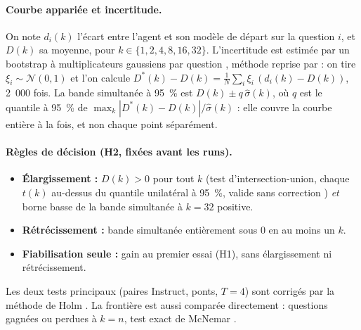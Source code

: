 \documentclass[11pt,a4paper]{article}
\begin{document}
\paragraph{Courbe appariée et incertitude.} On note $d_i(k)$ l'écart entre l'agent et son modèle de départ sur la question $i$, et $D(k)$ sa moyenne, pour $k \in \{1, 2, 4, 8, 16, 32\}$. L'incertitude est estimée par un bootstrap à multiplicateurs gaussiens par question \citep{chernozhukov2013gaussian}, méthode reprise par \citet{yang2026crossovers} : on tire $\xi_i \sim \mathcal{N}(0,1)$ et l'on calcule $D^*(k) - D(k) = \frac{1}{N}\sum_i \xi_i \,(d_i(k) - D(k))$, 2~000 fois. La bande simultanée à 95~\% est $D(k) \pm q\,\hat\sigma(k)$, où $q$ est le quantile à 95~\% de $\max_k |D^*(k) - D(k)|/\hat\sigma(k)$ : elle couvre la courbe entière à la fois, et non chaque point séparément.

\paragraph{Règles de décision (H2, fixées avant les runs).}
\begin{itemize}
\item \textbf{Élargissement :} $D(k) > 0$ pour tout $k$ (test d'intersection-union, chaque $t(k)$ au-dessus du quantile unilatéral à 95~\%, valide sans correction \citep{berger1982multiparameter}) \emph{et} borne basse de la bande simultanée à $k = 32$ positive.
\item \textbf{Rétrécissement :} bande simultanée entièrement sous 0 en au moins un $k$.
\item \textbf{Fiabilisation seule :} gain au premier essai (H1), sans élargissement ni rétrécissement.
\end{itemize}
Les deux tests principaux (paires Instruct, ponts, $T = 4$) sont corrigés par la méthode de Holm \citep{holm1979simple}. La frontière est aussi comparée directement : questions gagnées ou perdues à $k = n$, test exact de McNemar \citep{mcnemar1947note}.
\end{document}
